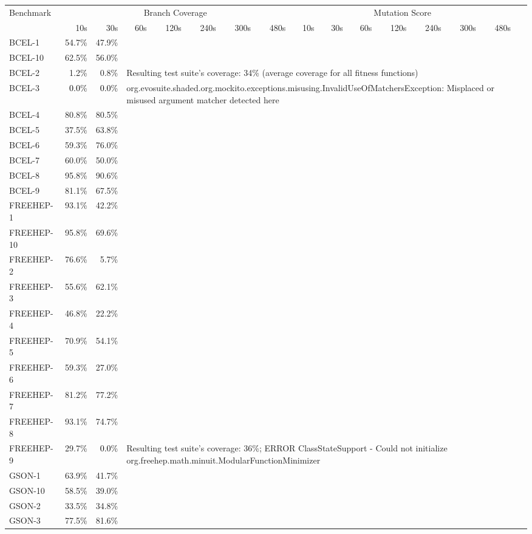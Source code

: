 \begin{tabular}{ l rrrrrrr rrrrrrrr}\toprule 
 Benchmark &  \multicolumn{7}{c}{Branch Coverage} &  \multicolumn{7}{c}{Mutation Score}\\ 
 & 10s & 30s & 60s & 120s & 240s & 300s & 480s & 10s & 30s & 60s & 120s & 240s & 300s & 480s \\ 
\midrule 
BCEL-1 & 54.7\% & 47.9\%\\ 
BCEL-10 & 62.5\% & 56.0\%\\ 
BCEL-2 & 1.2\% & 0.8\% & \multicolumn{13}{l}{Resulting test suite's coverage: 34\% (average coverage for all fitness functions)}\\ 
BCEL-3 & \cellcolor{light-gray} \textcolor{black}{0.0}\% &
                                                           \cellcolor{light-gray} \textcolor{black}{0.0}\%
& \multicolumn{13}{l}{org.evosuite.shaded.org.mockito.exceptions.misusing.InvalidUseOfMatchersException: 
Misplaced or misused argument matcher detected here}\\ 
BCEL-4 & 80.8\% & 80.5\%\\ 
BCEL-5 & 37.5\% & 63.8\%\\ 
BCEL-6 & 59.3\% & 76.0\%\\ 
BCEL-7 & 60.0\% & 50.0\%\\ 
BCEL-8 & 95.8\% & 90.6\%\\ 
BCEL-9 & 81.1\% & 67.5\%\\ 
FREEHEP-1 & 93.1\% & 42.2\%\\ 
FREEHEP-10 & 95.8\% & 69.6\%\\ 
FREEHEP-2 & 76.6\% & 5.7\%\\ 
FREEHEP-3 & 55.6\% & 62.1\%\\ 
FREEHEP-4 & 46.8\% & 22.2\%\\ 
FREEHEP-5 & 70.9\% & 54.1\%\\ 
FREEHEP-6 & 59.3\% & 27.0\%\\ 
FREEHEP-7 & 81.2\% & 77.2\%\\ 
FREEHEP-8 & 93.1\% & 74.7\%\\ 
FREEHEP-9 & 29.7\% & \cellcolor{light-gray} \textcolor{black}{0.0}\%
& \multicolumn{13}{l}{Resulting test suite's coverage: 36\%; ERROR ClassStateSupport - Could not initialize org.freehep.math.minuit.ModularFunctionMinimizer}\\ 
GSON-1 & 63.9\% & 41.7\%\\ 
GSON-10 & 58.5\% & 39.0\%\\ 
GSON-2 & 33.5\% & 34.8\%\\ 
GSON-3 & 77.5\% & 81.6\%\\ 

\end{tabular}
